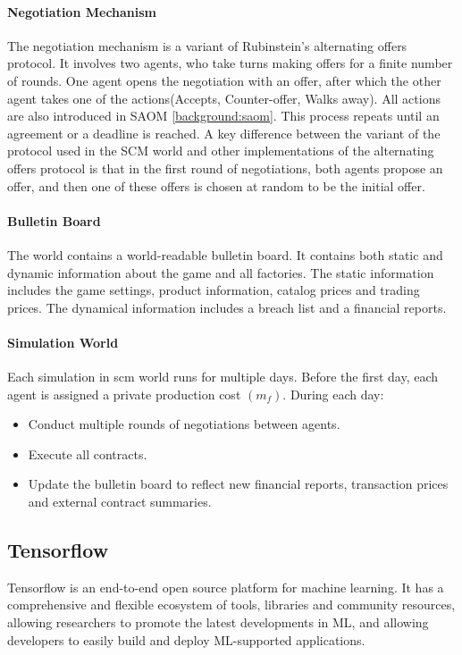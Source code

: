\paragraph{Negotiation Mechanism} The negotiation mechanism is a variant of Rubinstein's alternating offers protocol. It involves two agents, who take turns making offers for a finite number of rounds. One agent opens the negotiation with an offer, after which the other agent takes one of the actions(Accepts, Counter-offer, Walks away). All actions are also introduced in SAOM \ref{background:saom}. This process repeats until an agreement or a deadline is reached. A key difference between the variant of the protocol used in the SCM world and other implementations of the alternating offers protocol is that in the first round of negotiations, both agents propose an offer, and then one of these offers is chosen at random to be the initial offer.
\paragraph{Bulletin Board} The world contains a world-readable bulletin board. It contains both static and dynamic information about the game and all factories. The static information includes the game settings, product information, catalog prices and trading prices. The dynamical information includes a breach list and a financial reports.
\paragraph{Simulation World} Each simulation in \gls{scm} world runs for multiple days. Before the first day, each agent is assigned a private production cost $(m_f)$. During each day\parencite{Mohammad2021}:
\begin{itemize}
\item Conduct multiple rounds of negotiations between agents.
\item Execute all contracts.
\item Update the bulletin board to reflect new financial reports, transaction prices and external contract summaries.
\end{itemize}

\subsection{Tensorflow} Tensorflow is an end-to-end open source platform for machine learning. It has a comprehensive and flexible ecosystem of tools, libraries and community resources, allowing researchers to promote the latest developments in ML, and allowing developers to easily build and deploy ML-supported applications\parencite{tensorflow2015-whitepaper}.

